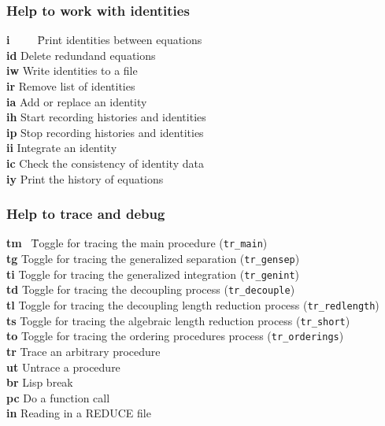 \documentclass[12pt]{article}
\begin{document}
\subsubsection{Help to work with identities}
\begin{tabbing}
  {\bf i}\ \ \ \ \ \= Print identities between equations \\
  {\bf id}   \> Delete redundand equations \\
  {\bf iw}   \> Write identities to a file \\
  {\bf ir}   \> Remove list of identities \\
  {\bf ia}   \> Add or replace an identity \\
  {\bf ih}   \> Start recording histories and identities \\
  {\bf ip}   \> Stop recording histories and identities \\
  {\bf ii}   \> Integrate an identity \\
  {\bf ic}   \> Check the consistency of identity data \\
  {\bf iy}   \> Print the history of equations
\end{tabbing}

\subsubsection{Help to trace and debug}
\begin{tabbing}
  {\bf tm}  \ \= Toggle for tracing the main procedure ({\tt tr\_main}) \\
  {\bf tg}    \> Toggle for tracing the generalized separation
                        ({\tt tr\_gensep}) \\
  {\bf ti}    \> Toggle for tracing the generalized integration
                        ({\tt tr\_genint})  \\
  {\bf td}    \> Toggle for tracing the decoupling process
                        ({\tt tr\_decouple}) \\
  {\bf tl}    \> Toggle for tracing the decoupling length reduction
                        process ({\tt tr\_redlength}) \\
  {\bf ts}    \> Toggle for tracing the algebraic length reduction
                        process ({\tt tr\_short}) \\
  {\bf to}    \> Toggle for tracing the ordering procedures
                        process ({\tt tr\_orderings}) \\
  {\bf tr}    \> Trace an arbitrary procedure \\
  {\bf ut}    \> Untrace a procedure \\
  {\bf br}    \> Lisp break          \\
  {\bf pc}    \> Do a function call  \\
  {\bf in}    \> Reading in a REDUCE file
\end{tabbing}
\end{document}
